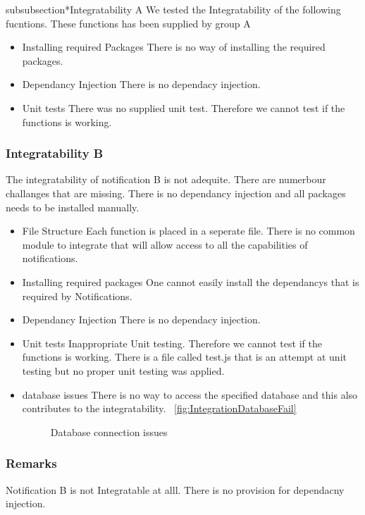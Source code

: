 subsubsection*{Integratability A}
We tested the Integratability of the following fucntions. These functions has been supplied by group A
\begin{itemize}
	\item Installing required Packages
	There is no way of installing the required packages.
	\item Dependancy Injection
	There is no dependacy injection.
	\item Unit tests
	There was no supplied unit test. Therefore we cannot test if the functions is working.
\end{itemize}
\subsubsection*{Integratability B}
The integratability of notification B is not adequite. There are numerbour challanges that are missing. There is no dependancy injection and all packages needs to be installed manually.
\begin{itemize}
	\item {File Structure} 
	Each function is placed in a seperate file. There is no common module to integrate that will allow access to all the capabilities of notifications.
	\item Installing required packages
	One cannot easily install the dependancys that is required by Notifications.
	\item Dependancy Injection
	There is no dependacy injection.
	\item Unit tests
	Inappropriate Unit testing. Therefore we cannot test if the functions is working. There is a file called test.js that is an attempt at unit testing but no proper unit testing was applied.
	\item database issues
	There is no way to access the specified database and this also contributes to the integratability. 
		~\ref{fig:IntegrationDatabaseFail}
		\begin{figure}[H]
			\centering
			\caption{Database connection issues}
			\label{fig:scope}
		\end{figure}
\end{itemize}
\subsubsection*{Remarks}
Notification B is not Integratable at alll. There is no provision for dependacny injection.
